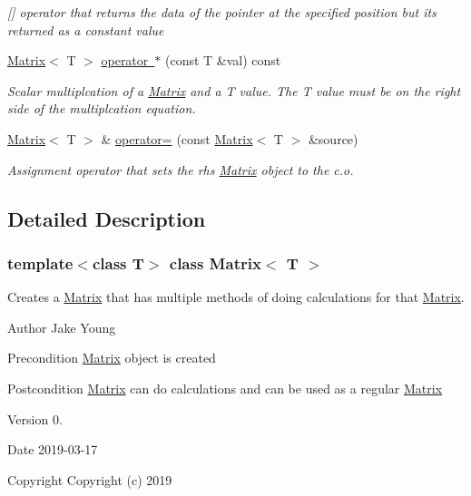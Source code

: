 \begin{DoxyCompactItemize}
\begin{DoxyCompactList}\small\item\em \mbox{[}\mbox{]} operator that returns the data of the pointer at the specified position but its returned as a constant value \end{DoxyCompactList}\item 
\mbox{\hyperlink{class_matrix}{Matrix}}$<$ T $>$ \mbox{\hyperlink{class_matrix_a9b987f07fb3d4fcf2b038cbfd6615650}{operator $\ast$}} (const T \&val) const
\begin{DoxyCompactList}\small\item\em Scalar multiplcation of a \mbox{\hyperlink{class_matrix}{Matrix}} and a T value. The T value must be on the right side of the multiplcation equation. \end{DoxyCompactList}\item 
\mbox{\hyperlink{class_matrix}{Matrix}}$<$ T $>$ \& \mbox{\hyperlink{class_matrix_a33c00fb6f2e9401d17d9ed615b965634}{operator=}} (const \mbox{\hyperlink{class_matrix}{Matrix}}$<$ T $>$ \&source)
\begin{DoxyCompactList}\small\item\em Assignment operator that sets the rhs \mbox{\hyperlink{class_matrix}{Matrix}} object to the c.\+o. \end{DoxyCompactList}\end{DoxyCompactItemize}


\subsection{Detailed Description}
\subsubsection*{template$<$class T$>$\newline
class Matrix$<$ T $>$}

Creates a \mbox{\hyperlink{class_matrix}{Matrix}} that has multiple methods of doing calculations for that \mbox{\hyperlink{class_matrix}{Matrix}}. 

\begin{DoxyAuthor}{Author}
Jake Young 
\end{DoxyAuthor}
\begin{DoxyPrecond}{Precondition}
\mbox{\hyperlink{class_matrix}{Matrix}} object is created 
\end{DoxyPrecond}
\begin{DoxyPostcond}{Postcondition}
\mbox{\hyperlink{class_matrix}{Matrix}} can do calculations and can be used as a regular \mbox{\hyperlink{class_matrix}{Matrix}} 
\end{DoxyPostcond}
\begin{DoxyVersion}{Version}
0. 
\end{DoxyVersion}
\begin{DoxyDate}{Date}
2019-\/03-\/17
\end{DoxyDate}
\begin{DoxyCopyright}{Copyright}
Copyright (c) 2019 
\end{DoxyCopyright}


